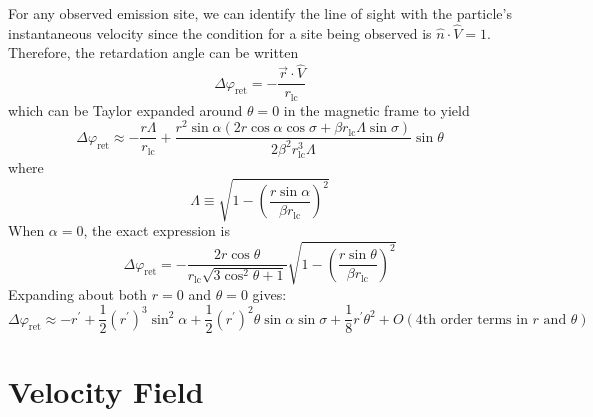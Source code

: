 \documentclass{book}
\newcommand{\phase}{\varphi}
\newcommand{\rL}{r_\text{lc}} %
\begin{document}
For any observed emission site, we can identify the line of sight with the particle's instantaneous velocity since the condition for a site being observed is $\hat{n}\cdot\hat{V} = 1$.
Therefore, the retardation angle can be written
\begin{equation}
    \Delta\phase_\text{ret} = -\frac{\vec{r}\cdot\hat{V}}{\rL}
\end{equation}
which can be Taylor expanded around $\theta = 0$ in the magnetic frame to yield
\begin{equation}
    \Delta\phase_\text{ret} \approx
        -\frac{r\Lambda}{\rL} + \frac{r^2\sin\alpha(2r\cos\alpha\cos\sigma + \beta \rL \Lambda \sin\sigma)}{2\beta^2 \rL^3 \Lambda} \sin\theta
\end{equation}
where
\begin{equation}
    \Lambda \equiv \sqrt{1-\left(\frac{r\sin\alpha}{\beta \rL}\right)^2}
\end{equation}
When $\alpha = 0$, the exact expression is
\begin{equation}
    \Delta\phase_\text{ret} = -\frac{2r\cos\theta}{\rL\sqrt{3\cos^2\theta+1}}
        \sqrt{1 - \left(\frac{r\sin\theta}{\beta \rL}\right)^2}
\end{equation}
Expanding about both $r = 0$ and $\theta = 0$ gives:
\begin{equation}
    \Delta\phase_\text{ret} \approx
        -r^\prime +
        \frac12(r^\prime)^3\sin^2\alpha +
        \frac12(r^\prime)^2\theta\sin\alpha\sin\sigma +
        \frac18 r^\prime\theta^2 +
        O(\text{4th order terms in $r$ and $\theta$})
\end{equation}

\section{Velocity Field}
\label{sec:vfield}
\end{document}
